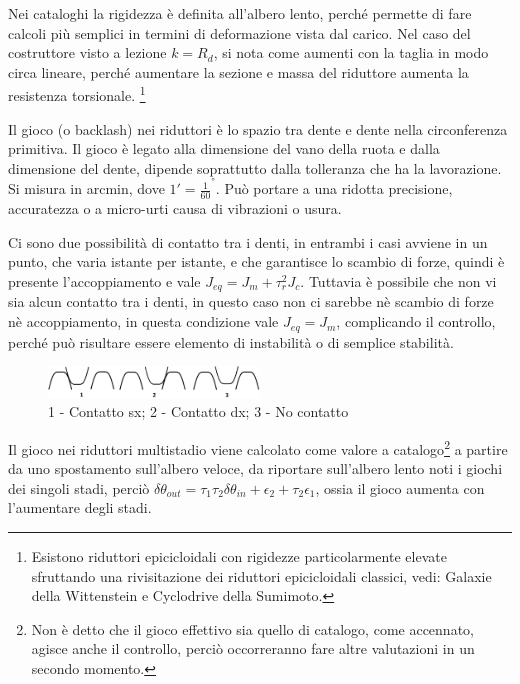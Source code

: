 Nei cataloghi la rigidezza è definita all'albero lento, perché permette di fare calcoli più semplici in termini di deformazione vista dal carico.
Nel caso del costruttore visto a lezione $k=R_d$, si nota come aumenti con la taglia in modo circa lineare, perché aumentare la sezione e massa del riduttore aumenta la resistenza torsionale. \footnote{Esistono riduttori epicicloidali con rigidezze particolarmente elevate sfruttando una rivisitazione dei riduttori epicicloidali classici, vedi: Galaxie della Wittenstein e Cyclodrive della Sumimoto.}

Il gioco (o backlash) nei riduttori è lo spazio tra dente e dente nella circonferenza primitiva. Il gioco è legato alla dimensione del vano della ruota e dalla dimensione del dente, dipende soprattutto dalla tolleranza che ha la lavorazione.
Si misura in arcmin, dove $1'=\frac{1}{60}^°$.
Può portare a una ridotta precisione, accuratezza o a micro-urti causa di vibrazioni o usura. 

Ci sono due possibilità di contatto tra i denti, in entrambi i casi avviene in un punto, che varia istante per istante, e che garantisce lo scambio di forze, quindi è presente l'accoppiamento e vale $J_{eq}=J_m+\tau_r^2 J_c$. 
Tuttavia è possibile che non vi sia alcun contatto tra i denti, in questo caso non ci sarebbe nè scambio di forze nè accoppiamento, in questa condizione vale $J_{eq}=J_m$, complicando il controllo, perché può risultare essere elemento di instabilità o di semplice stabilità.

\begin{figure}[h]
    \centering
    \includegraphics[width=0.5\textwidth]{Immagini/config_denti_gioco.png}
    \caption{1 - Contatto sx; 2 - Contatto dx; 3 - No contatto}
\end{figure}

Il gioco nei riduttori multistadio viene calcolato come valore a catalogo\footnote{Non è detto che il gioco effettivo sia quello di catalogo, come accennato, agisce anche il controllo, perciò occorreranno fare altre valutazioni in un secondo momento.} a partire da uno spostamento sull'albero veloce, da riportare sull'albero lento noti i giochi dei singoli stadi, perciò $\delta \theta_{out} = \tau_1\tau_2\delta \theta_{in} + \epsilon_2 +\tau_2\epsilon_1$, ossia il gioco aumenta con l'aumentare degli stadi.

